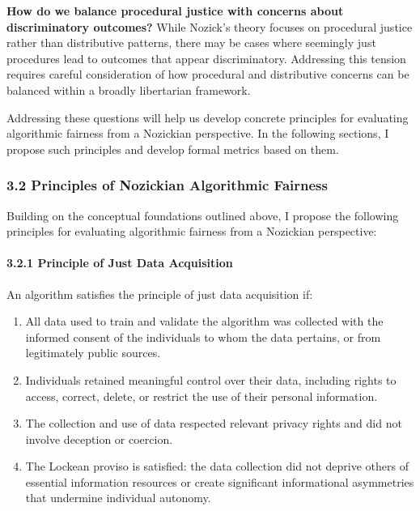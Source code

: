 \textbf{How do we balance procedural justice with concerns about
discriminatory outcomes?} While Nozick's theory focuses on procedural
justice rather than distributive patterns, there may be cases where
seemingly just procedures lead to outcomes that appear discriminatory.
Addressing this tension requires careful consideration of how procedural
and distributive concerns can be balanced within a broadly libertarian
framework.

Addressing these questions will help us develop concrete principles for
evaluating algorithmic fairness from a Nozickian perspective. In the
following sections, I propose such principles and develop formal metrics
based on them.

\subsubsection{3.2 Principles of Nozickian Algorithmic
Fairness}\label{principles-of-nozickian-algorithmic-fairness}

Building on the conceptual foundations outlined above, I propose the
following principles for evaluating algorithmic fairness from a
Nozickian perspective:

\paragraph{3.2.1 Principle of Just Data
Acquisition}\label{principle-of-just-data-acquisition}

An algorithm satisfies the principle of just data acquisition if:

\begin{enumerate}
\def\labelenumi{\arabic{enumi}.}
\tightlist
\item
  All data used to train and validate the algorithm was collected with
  the informed consent of the individuals to whom the data pertains, or
  from legitimately public sources.
\item
  Individuals retained meaningful control over their data, including
  rights to access, correct, delete, or restrict the use of their
  personal information.
\item
  The collection and use of data respected relevant privacy rights and
  did not involve deception or coercion.
\item
  The Lockean proviso is satisfied: the data collection did not deprive
  others of essential information resources or create significant
  informational asymmetries that undermine individual autonomy.
\end{enumerate}

